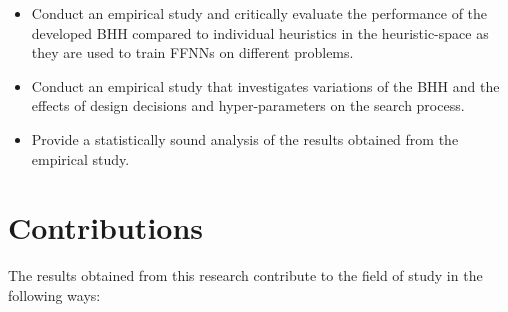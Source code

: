 \begin{itemize}
      \item
            Conduct an empirical study and critically evaluate the performance of the
            developed \Ac{BHH} compared to individual heuristics in the heuristic-space
            as they are used to train \acp{FFNN} on different problems.

      \item
            Conduct an empirical study that investigates variations of the \Ac{BHH} and the
            effects of design decisions and hyper-parameters on the search process.

      \item
            Provide a statistically sound analysis of the results obtained from the
            empirical study.
\end{itemize}


\section{Contributions}
\label{sec:introduction:contributions}

The results obtained from this research contribute to the field of study in the
following ways:

